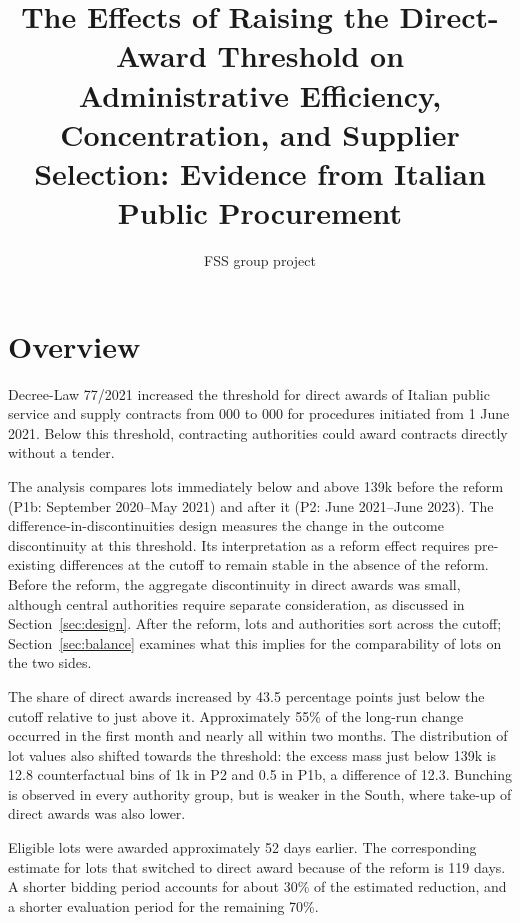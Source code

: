 \documentclass[11pt,a4paper]{article}
\title{The Effects of Raising the Direct-Award Threshold on Administrative Efficiency, Concentration, and Supplier Selection: Evidence from Italian Public Procurement}
\date{}
\author{FSS group project}
\begin{document}
\maketitle
\thispagestyle{fancy}

\tableofcontents
\newpage

\section{Overview}

Decree-Law 77/2021 increased the threshold for direct awards of Italian public service and supply contracts from 000 to 000 for procedures initiated from 1 June 2021. Below this threshold, contracting authorities could award contracts directly without a tender.

The analysis compares lots immediately below and above \texteuro139k before the reform (P1b: September 2020--May 2021) and after it (P2: June 2021--June 2023). The difference-in-discontinuities design measures the change in the outcome discontinuity at this threshold. Its interpretation as a reform effect requires pre-existing differences at the cutoff to remain stable in the absence of the reform. Before the reform, the aggregate discontinuity in direct awards was small, although central authorities require separate consideration, as discussed in Section~\ref{sec:design}. After the reform, lots and authorities sort across the cutoff; Section~\ref{sec:balance} examines what this implies for the comparability of lots on the two sides.

The share of direct awards increased by 43.5 percentage points just below the cutoff relative to just above it. Approximately 55\% of the long-run change occurred in the first month and nearly all within two months. The distribution of lot values also shifted towards the threshold: the excess mass just below \texteuro139k is 12.8 counterfactual bins of \texteuro1k in P2 and 0.5 in P1b, a difference of 12.3. Bunching is observed in every authority group, but is weaker in the South, where take-up of direct awards was also lower.

Eligible lots were awarded approximately 52 days earlier. The corresponding estimate for lots that switched to direct award because of the reform is 119 days. A shorter bidding period accounts for about 30\% of the estimated reduction, and a shorter evaluation period for the remaining 70\%.
\end{document}
